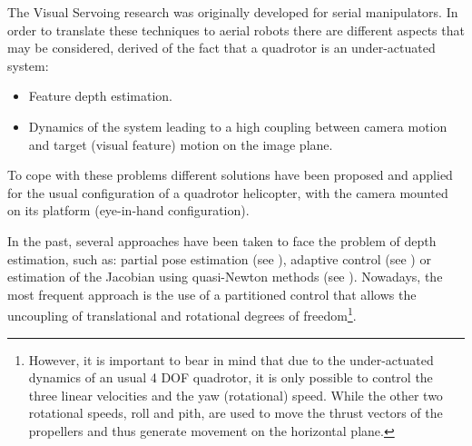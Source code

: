 
The Visual Servoing research was originally developed for serial manipulators. In order to translate these techniques to aerial robots there are different aspects that may be considered, derived of the fact that a quadrotor is an under-actuated system:

\begin{itemize}
	\item Feature depth estimation.
	\item Dynamics of the system leading to a high coupling between camera motion and target (visual feature) motion on the image plane.
\end{itemize}

To cope with these problems different solutions have been proposed and applied for the usual configuration of a quadrotor helicopter, with the camera mounted on its platform (eye-in-hand configuration).

 In the past, several approaches have been taken to face the problem of depth estimation, such as: partial pose estimation (see \cite{malis_2_1999}), adaptive control (see \cite{Papanikolopoulos}) or estimation of the Jacobian using quasi-Newton methods (see \cite{Piepmeier}). Nowadays, the most frequent approach is the use of a partitioned control that allows the uncoupling of translational and rotational degrees of freedom\footnote{However, it is important to bear in mind that due to the under-actuated dynamics of an usual 4 DOF quadrotor, it is only possible to control the three linear velocities and the yaw (rotational) speed. While the other two rotational speeds, roll and pith, are used to move the thrust vectors of the propellers and thus generate movement on the horizontal plane.}.
 
